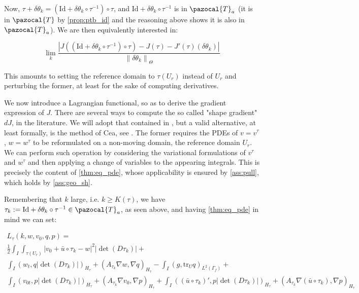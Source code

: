 \documentclass[english,a4paper,9pt,oneside]{scrbook}	%
\theoremstyle{break}
\theoremstyle{remark}
\newcommand{\norm}[1]{\left\lVert#1\right\rVert}
\newcommand{\tr}{\text{tr}}
\newcommand{\cT}{\pazocal{T}}
\newcommand{\id}{\text{Id}}
\newcommand{\te}{\theta}
\newcommand{\Te}{\Theta}
\begin{document}

Now, $\tau+\delta \te_k  = (\id+\delta\te_k \circ \tau^{-1})\circ \tau$, and $\id+\delta\te_k \circ \tau^{-1}$ is in $\cT_a$ (it is in $\cT$ by \cref{prop:ptb_id} and the reasoning above shows it is also in $\cT_a$). We are then equivalently interested in:

$$\lim_{k}\frac{|J((\id+\delta\te_k \circ \tau^{-1})\circ \tau)-J(\tau)-J'(\tau)(\delta \te_k)|}{\norm{\delta \te_k}_{\Te}}$$

This amounts to setting the reference domain to $\tau(U_r)$ instead of $U_r$ and perturbing the former, at least for the sake of computing derivatives.

We now introduce a Lagrangian functional, so as to derive the gradient expression of $J$. There are several ways to compute the so called "shape gradient" $dJ$, in the literature. We will adopt that contained in \cite{avg_adj}, but a valid alternative, at least formally, is the method of Cea, see \cite{cea}. The former requires the PDEs of $v=v^\tau$, $w=w^\tau$ to be reformulated on a non-moving domain, the reference domain $U_r$. We can perform such operation by considering the variational formulations of $v^\tau$ and $w^\tau$ and then applying a change of variables to the appearing integrals. This is precisely the content of \cref{thm:eq_pde}, whose applicability is ensured by \cref{ass:pull}, which holds by \cref{ass:geo_sh}.

Remembering that $k$ large, i.e. $k\geq K(\tau)$, we have $\tau_k:=\id+\delta\te_k \circ \tau^{-1} \in \cT_a$, as seen above, and  having \cref{thm:eq_pde} in mind we can set:

\begin{align*}
L_\tau(k,w,v_0,q,p) = \\
\frac{1}{2}\int_I \int_{\tau(U_r)}|v_0+\bar{u} \circ \tau_k - w|^2|\det(D\tau_k)|+\\
\int_I ( w_t , q |\det(D\tau_k)|)_{H_\tau}+ (A_{\tau_k}\nabla w, \nabla q)_{H_\tau} -\int_I(g,\tr_{U} q)_{L^2(\Gamma_f)} +\\ \int_I (v_{0t},p |\det(D\tau_k)|)_{H_\tau} + (A_{\tau_k} \nabla v_0, \nabla p)_{H_\tau}+\int_I((\bar{u}\circ \tau_k)',p|\det(D\tau_k)|)_{H_\tau}+(A_{\tau_k} \nabla (\bar{u} \circ \tau_k), \nabla p)_{H_\tau}
\end{align*}
\end{document}
